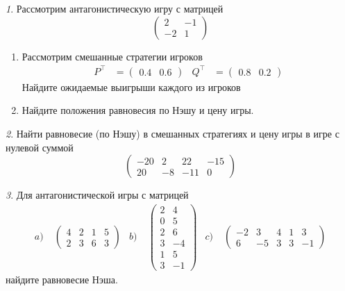 \documentclass[12pt]{article}
\theoremstyle{remark}
\newtheorem{exercise}{}[subsection]
\begin{document}
\begin{exercise}
Рассмотрим антагонистическую игру с матрицей
\[
	\begin{pmatrix}
	2 & -1 \\ -2 & 1
	\end{pmatrix}
\]
\begin{enumerate}
	\item Рассмотрим  смешанные стратегии игроков 
	\begin{align*}
		P^\top&=\begin{pmatrix} 0.4 & 0.6 \end{pmatrix} &
		Q^\top&=\begin{pmatrix} 0.8 & 0.2 \end{pmatrix}
	\end{align*}
	Найдите ожидаемые выигрыши каждого из игроков
	\item Найдите положения равновесия по Нэшу и цену игры.
\end{enumerate}
\end{exercise}

\begin{exercise}
Найти равновесие (по Нэшу) в смешанных стратегиях и цену игры в
игре с нулевой суммой
\[
	\begin{pmatrix}
	-20 & 2 & 22 & -15 \\ 20 & -8 & -11 & 0
    \end{pmatrix}
\]
\end{exercise}

\begin{exercise}
Для антагонистической игры с матрицей
\begin{align*}
	a)&\;\begin{pmatrix} 4 & 2 & 1 & 5 \\ 2 & 3 & 6 & 3 \end{pmatrix} &
	b)&\; \begin{pmatrix} 2 & 4 \\ 0 & 5 \\ 2 & 6 \\ 3 & -4 \\ 1 & 5 \\ 3 & -1\end{pmatrix} &
	c)&\; \begin{pmatrix} -2 & 3 & 4 & 1 & 3 \\ 6 & -5 & 3 & 3 & -1 \end{pmatrix}
\end{align*}
найдите  равновесие Нэша.
\end{exercise}
\end{document}
